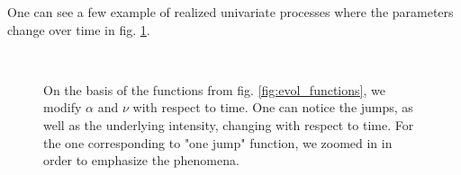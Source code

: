 \vspace{0.5cm}

One can see a few example of realized univariate processes where the parameters change over time in fig. \ref{fig:param_dep_hawkes}. 


\begin{figure}
\centering
{} 
\\

\caption{On the basis of the functions from fig. \ref{fig:evol_functions}, we modify $\alpha$ and $\nu$ with respect to time. One can notice the jumps, as well as the underlying intensity, changing with respect to time. For the one corresponding to "one jump" function, we zoomed in in order to emphasize the phenomena.}
\label{fig:param_dep_hawkes}
\end{figure}











